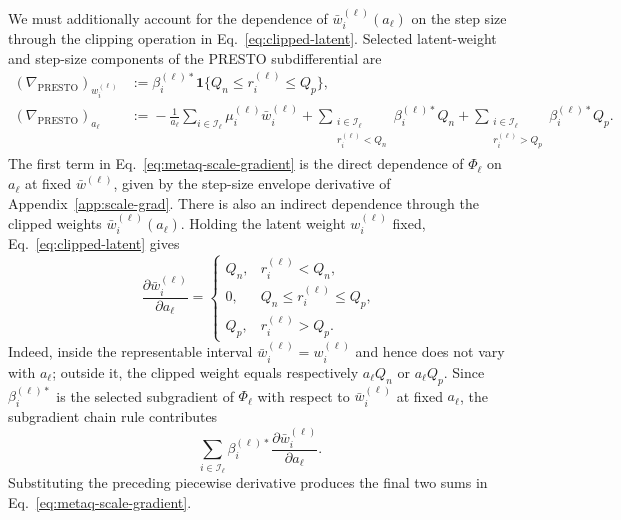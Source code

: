 \documentclass{article}
\begin{document}
We must additionally account for the dependence of
$\bar w_i^{(\ell)}(a_\ell)$ on the step size through the clipping operation in
Eq.~\eqref{eq:clipped-latent}. Selected latent-weight and step-size components
of the PRESTO subdifferential are
\begin{align}
  \left(\nabla_{\mathrm{PRESTO}}\right)_{w_i^{(\ell)}}
  &:={}
  \beta_i^{(\ell)*}
  \mathbf 1\{Q_n\leq r_i^{(\ell)}\leq Q_p\},
  \label{eq:metaq-weight-gradient}\\
  \left(\nabla_{\mathrm{PRESTO}}\right)_{a_\ell}
  &:={}
  -\frac{1}{a_\ell}
   \sum_{i\in\mathcal I_\ell}
   \mu_i^{(\ell)}\bar w_i^{(\ell)}
  +\sum_{\substack{i\in\mathcal I_\ell\\r_i^{(\ell)}<Q_n}}
   \beta_i^{(\ell)*}Q_n
  +\sum_{\substack{i\in\mathcal I_\ell\\r_i^{(\ell)}>Q_p}}
   \beta_i^{(\ell)*}Q_p.
  \label{eq:metaq-scale-gradient}
\end{align}
The first term in Eq.~\eqref{eq:metaq-scale-gradient} is the direct dependence
of $\Phi_\ell$ on $a_\ell$ at fixed $\bar w^{(\ell)}$, given by
the step-size envelope derivative of Appendix~\ref{app:scale-grad}. There is also an indirect dependence through
the clipped weights $\bar w_i^{(\ell)}(a_\ell)$. Holding the latent weight
$w_i^{(\ell)}$ fixed, Eq.~\eqref{eq:clipped-latent} gives
\[
  \frac{\partial\bar w_i^{(\ell)}}{\partial a_\ell}
  =
  \begin{cases}
    Q_n, & r_i^{(\ell)}<Q_n,\\
    0, & Q_n\leq r_i^{(\ell)}\leq Q_p,\\
    Q_p, & r_i^{(\ell)}>Q_p.
  \end{cases}
\]
Indeed, inside the representable interval
$\bar w_i^{(\ell)}=w_i^{(\ell)}$ and hence does not vary with $a_\ell$;
outside it, the clipped weight equals respectively $a_\ell Q_n$ or
$a_\ell Q_p$. Since $\beta_i^{(\ell)*}$ is the selected subgradient of
$\Phi_\ell$ with respect to $\bar w_i^{(\ell)}$ at fixed $a_\ell$, the
subgradient chain rule contributes
\[
  \sum_{i\in\mathcal I_\ell}
  \beta_i^{(\ell)*}
  \frac{\partial\bar w_i^{(\ell)}}{\partial a_\ell}.
\]
Substituting the preceding piecewise derivative produces the final two sums in
Eq.~\eqref{eq:metaq-scale-gradient}.
\end{document}
